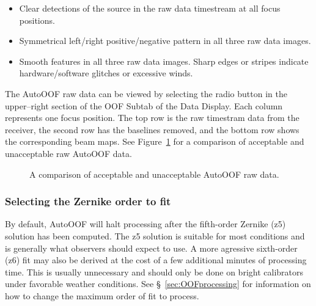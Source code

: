 \begin{itemize}[itemsep=0pt]
\item Clear detections of the source in the raw data timestream at all focus positions.
\item Symmetrical left/right positive/negative pattern in all three raw data images.
\item Smooth features in all three raw data images.  Sharp edges or stripes indicate
hardware/software glitches or excessive winds.
\end{itemize}

The AutoOOF raw data can be viewed by selecting the  radio button in the
upper--right section of the OOF Subtab of the Data Display. Each column represents one focus
position.  The top row is the raw timestram data from the receiver, the second row
has the baselines removed, and the bottom row shows the corresponding beam maps.
See Figure~\ref{fig:rawOOFdata} for a comparison of acceptable and unacceptable
raw AutoOOF data.

\newpage

\begin{figure}[!h]
\begin{center}
\hfill
{}
\caption[Comparison of AutoOOF raw data]
{A comparison of acceptable and unacceptable AutoOOF raw data.}
\label{fig:rawOOFdata}
\end{center}
\end{figure}


\subsubsection{Selecting the Zernike order to fit}

By default, AutoOOF will halt processing after the fifth-order Zernike (z5) solution
has been computed. The z5 solution is suitable for most conditions and is generally what
observers should expect to use. A more agressive sixth-order (z6) fit may also be
derived at the cost of a few additional minutes of processing time.  This is usually
unnecessary and should only be done on bright calibrators under favorable weather
conditions. See \S~\ref{sec:OOFprocessing} for information on how to change the maximum
order of fit to process.

